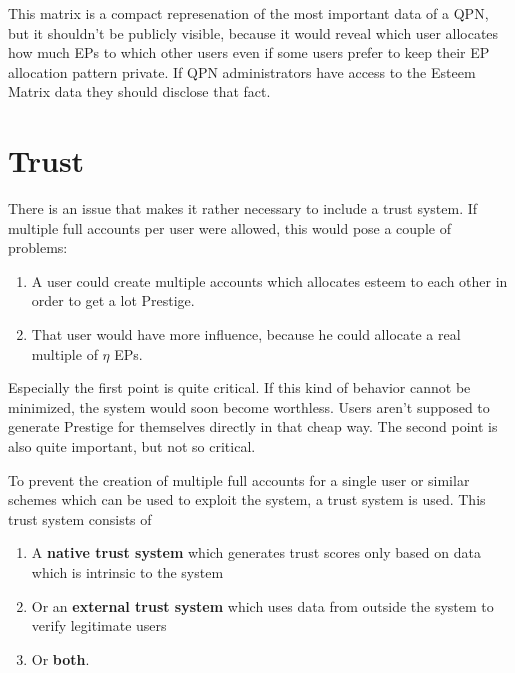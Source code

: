 \documentclass[a4paper,12pt]{scrartcl}
\begin{document}
This matrix is a compact represenation of the most important data of a QPN, but it shouldn't be publicly visible, because it would reveal which user allocates how much EPs to which other users even if some users prefer to keep their EP allocation pattern private. If QPN administrators have access to the Esteem Matrix data they should disclose that fact.

\section{Trust}
There is an issue that makes it rather necessary to include a trust system. If multiple full accounts per user were allowed, this would pose a couple of problems:
\begin{enumerate}
 \item A user could create multiple accounts which allocates esteem to each other in order to get a lot Prestige.
 \item That user would have more influence, because he could allocate a real multiple of $\eta$ EPs.
\end{enumerate}
Especially the first point is quite critical. If this kind of behavior cannot be minimized, the system would soon become worthless. Users aren't supposed to generate Prestige for themselves directly in that cheap way.
The second point is also quite important, but not so critical.

To prevent the creation of multiple full accounts for a single user or similar schemes which can be used to exploit the system, a trust system is used. This trust system consists of
\begin{enumerate}
 \item A \textbf{native trust system} which generates trust scores only based on data which is intrinsic to the system
 \item Or an \textbf{external trust system} which uses data from outside the system to verify legitimate users
 \item Or \textbf{both}.
\end{enumerate}
\end{document}
